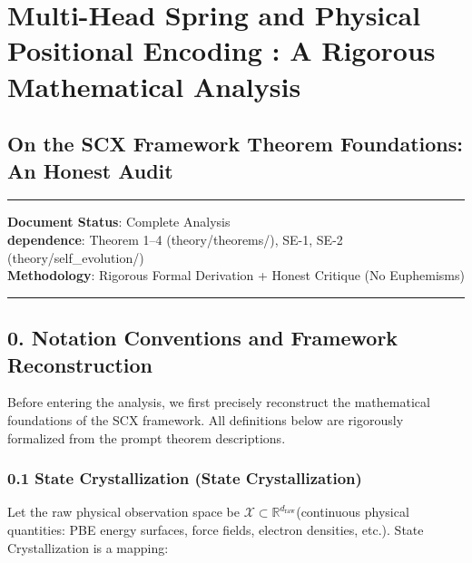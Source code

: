 \documentclass[
  12pt,
]{article}
\author{SCX}
\date{2026}
\begin{document}
\section{Multi-Head Spring and Physical Positional Encoding
: A Rigorous Mathematical Analysis}\label{multi-head-spring-ux4e0e-physical-positional-encoding-ux7684ux4e25ux683cux6570ux5b66ux5206ux6790}

\subsection{On the SCX
Framework Theorem Foundations: An Honest Audit}\label{ux5bf9-scx-ux6846ux67b6ux5b9aux7406ux57faux7840ux7684ux8bdaux5b9eux5ba1ux67e5}

\begin{center}\rule{0.5\linewidth}{0.5pt}\end{center}

\textbf{Document Status}: Complete Analysis\\
\textbf{dependence}: Theorem 1--4 (theory/theorems/), SE-1, SE-2
(theory/self\_evolution/)\\
\textbf{Methodology}: Rigorous Formal Derivation + Honest Critique (No Euphemisms)

\begin{center}\rule{0.5\linewidth}{0.5pt}\end{center}

\subsection{0.
Notation Conventions and Framework Reconstruction}\label{ux7b26ux53f7ux7ea6ux5b9aux4e0eux6846ux67b6ux91cdux6784}

Before entering the analysis, we first precisely reconstruct the mathematical foundations of the SCX framework. All definitions below are rigorously formalized from the
prompt theorem descriptions.

\subsubsection{0.1 State Crystallization (State
Crystallization)}\label{ux72b6ux6001ux7ed3ux6676state-crystallization}

Let the raw physical observation space be
\(\mathcal{X} \subset \mathbb{R}^{d_{\text{raw}}}\)(continuous physical quantities: PBE
energy surfaces, force fields, electron densities, etc.). State Crystallization is a mapping:
\end{document}
